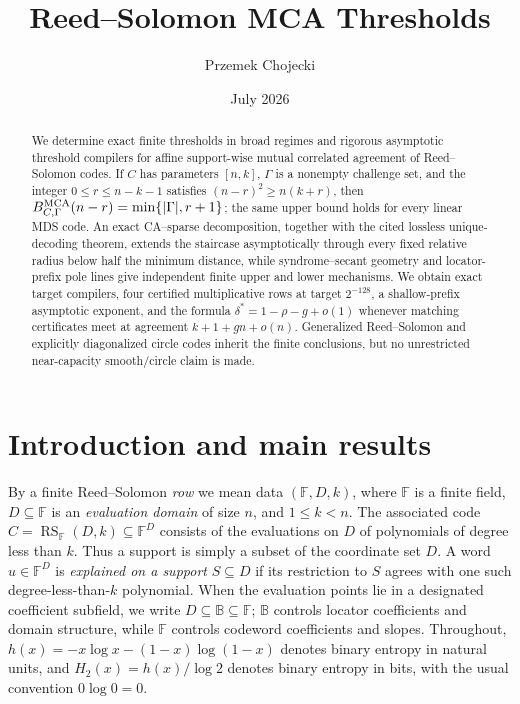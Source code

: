 \documentclass[11pt,a4paper]{amsart}
\title{Reed--Solomon MCA Thresholds}
\author{Przemek Chojecki}
\date{July 2026}
\numberwithin{equation}{section}
\theoremstyle{remark}
\DeclareMathOperator{\RS}{RS}
\newcommand{\F}{\mathbb F}
\newcommand{\B}{\mathbb B}
\begin{document}
\begin{abstract}
We determine exact finite thresholds in broad regimes and rigorous asymptotic threshold compilers for affine support-wise mutual correlated agreement of Reed--Solomon codes.  If \(C\) has parameters \([n,k]\), \(\Gamma\) is a nonempty challenge set, and the integer \(0\le r\le n-k-1\) satisfies \((n-r)^2\ge n(k+r)\), then \(B_{C,\Gamma}^{\rm MCA}(n-r)=\min\{|\Gamma|,r+1\}\); the same upper bound holds for every linear MDS code.  An exact CA--sparse decomposition, together with the cited lossless unique-decoding theorem, extends the staircase asymptotically through every fixed relative radius below half the minimum distance, while syndrome--secant geometry and locator-prefix pole lines give independent finite upper and lower mechanisms.  We obtain exact target compilers, four certified multiplicative rows at target \(2^{-128}\), a shallow-prefix asymptotic exponent, and the formula \(\delta^*=1-\rho-g+o(1)\) whenever matching certificates meet at agreement \(k+1+gn+o(n)\).  Generalized Reed--Solomon and explicitly diagonalized circle codes inherit the finite conclusions, but no unrestricted near-capacity smooth/circle claim is made.
\end{abstract}

\maketitle

\section{Introduction and main results}\label{sec:introduction}

By a finite Reed--Solomon \emph{row} we mean data
\((\F,D,k)\), where \(\F\) is a finite field,
\(D\subseteq\F\) is an \emph{evaluation domain} of size \(n\), and
\(1\le k<n\).  The associated code
\(C=\RS_\F(D,k)\subseteq\F^D\) consists of the evaluations on \(D\) of
polynomials of degree less than \(k\).  Thus a support is simply a subset
of the coordinate set \(D\).  A word \(u\in\F^D\) is
\emph{explained on a support} \(S\subseteq D\) if its restriction to
\(S\) agrees with one such degree-less-than-\(k\) polynomial.
When the evaluation points lie in a designated coefficient subfield, we
write \(D\subseteq\B\subseteq\F\); \(\B\) controls locator coefficients
and domain structure, while \(\F\) controls codeword coefficients and
slopes.
Throughout,
\(h(x)=-x\log x-(1-x)\log(1-x)\) denotes binary entropy in natural
units, and \(H_2(x)=h(x)/\log 2\) denotes binary entropy in bits, with the
usual convention \(0\log0=0\).
\end{document}
